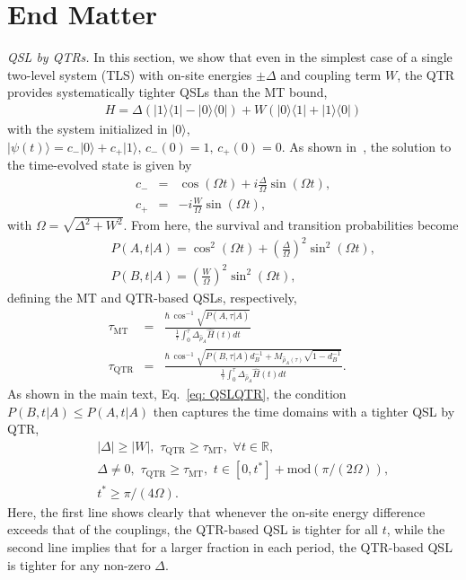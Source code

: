 \documentclass[prl,aps,amssymb,twocolumn,superscriptaddress, notitlepage, longbibliography]{revtex4-2}
\begin{document}
\section{End Matter}
{\it QSL by QTRs.}
In this section, we show that even in the simplest case of a single two-level system (TLS) with on-site energies $\pm\Delta$ and coupling term $W$, the QTR provides systematically tighter QSLs than the MT bound,
\begin{eqnarray}
    H=\Delta\left(\lvert 1\rangle\langle 1\rvert-\lvert 0\rangle\langle 0\rvert\right)+W\left(\lvert 0\rangle\langle 1\rvert+\lvert 1\rangle\langle 0\rvert\right)
\end{eqnarray}
with the system initialized in $\lvert 0\rangle$, $\lvert\psi(t)\rangle=c_-\lvert 0\rangle+c_+\lvert 1\rangle,\,c_-(0)=1,\,c_+(0)=0$. As shown in~\cite{SM}, the solution to the time-evolved state is given by
\begin{eqnarray}
    c_-&=&\cos\left(\Omega t\right)+i\frac{\Delta}{\Omega}\sin\left(\Omega t\right),\\
    c_+&=&-i\frac{W}{\Omega}\sin\left(\Omega t\right),
\end{eqnarray}
with $\Omega=\sqrt{\Delta^2+W^2}$.
From here, the survival and transition probabilities become
\begin{eqnarray}
    &&P(A,t\vert A)=\cos^2(\Omega t)+\left(\frac{\Delta}{\Omega}\right)^2\sin^2(\Omega t),\\
    &&P(B,t\vert A)=\left(\frac{W}{\Omega}\right)^2\sin^2(\Omega t),
\end{eqnarray}
defining the MT and QTR-based QSLs, respectively,
\begin{eqnarray}
    \tau_\mathrm{MT}&\!=\!&\frac{\hbar \,\cos^{-1}\sqrt{P(A,\tau|A)}}{\frac{1}{\tau}\int_0^\tau \Delta_{\hat{\rho}_A} \hat H(t) dt}\\
    \tau_\mathrm{QTR}&\!=\!&\frac{\hbar \,\cos^{-1}\sqrt{P(B,\tau|A)d^{-1}_B+M_{\hat\rho_A(\tau)}\sqrt{1-d^{-1}_B}}}{\frac{1}{\tau}\int_0^\tau \Delta_{\hat{\rho}_A} \hat H(t) dt}.\quad
\end{eqnarray}
As shown in the main text, Eq.~\eqref{eq: QSLQTR}, the condition $P(B,t\vert A)\leq P(A,t\vert A)$ then captures the time domains with a tighter QSL by QTR,
\begin{eqnarray}
    &&|\Delta|\geq|W|,\,\,\tau_\mathrm{QTR}\geq\tau_{\mathrm{MT}},\,\,\forall t\in\mathbb R,\\
    &&\Delta\neq 0,\,\,\tau_\mathrm{QTR}\geq\tau_\mathrm{MT},\,\, t\in[0,t^*]+\mathrm{mod}(\pi/(2\Omega)),\\
    &&t^*\geq \pi/(4\Omega).\nonumber
\end{eqnarray}
Here, the first line shows clearly that whenever the on-site energy difference exceeds that of the couplings, the QTR-based QSL is tighter for all $t$, while the second line implies that for a larger fraction in each period, the QTR-based QSL is tighter for any non-zero $\Delta$.
\end{document}
